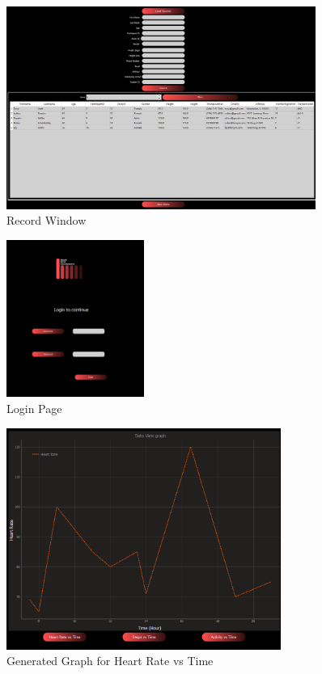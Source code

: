 \documentclass[12pt, titlepage]{article}
\begin{document}
\begin{figure}[H]
	\begin{center}
		 \includegraphics[width=0.9\textwidth]{Record}
		\caption{Record Window}
		\label{Record} 
	\end{center}
\end{figure}

\begin{figure}[H]
	\begin{center}
		 \includegraphics[width=0.4\textwidth]{login}
		\caption{Login Page}
		\label{Login} 
	\end{center}
\end{figure}

\begin{figure}[H]
	\begin{center}
		 \includegraphics[width=0.8\textwidth]{Graph}
		\caption{Generated Graph for Heart Rate vs Time}
		\label{Graph} 
	\end{center}
\end{figure}
\end{document}
